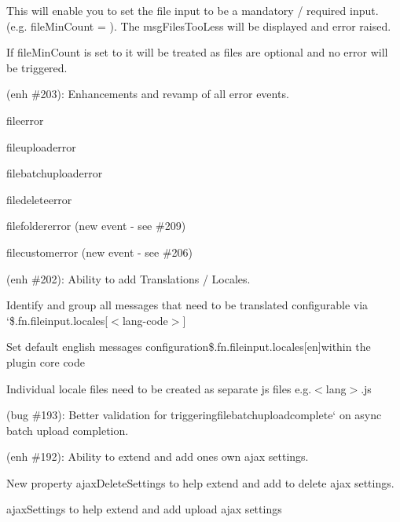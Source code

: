 \begin{DoxyItemize}
\begin{DoxyItemize}
\item This will enable you to set the file input to be a mandatory / required input. (e.\+g. {\ttfamily file\+Min\+Count} = {}). The {\ttfamily msg\+Files\+Too\+Less} will be displayed and error raised.
\item If {\ttfamily file\+Min\+Count} is set to {} it will be treated as files are optional and no error will be triggered.
\end{DoxyItemize}
\item (enh \#203)\+: Enhancements and revamp of all error events.
\begin{DoxyItemize}
\item fileerror
\item fileuploaderror
\item filebatchuploaderror
\item filedeleteerror
\item filefoldererror (new event -\/ see \#209)
\item filecustomerror (new event -\/ see \#206)
\end{DoxyItemize}
\item (enh \#202)\+: Ability to add Translations / Locales.
\begin{DoxyItemize}
\item Identify and group all messages that need to be translated configurable via `\$.fn.\+fileinput.\+locales\mbox{[}\textquotesingle{}$<$lang-\/code$>$\textquotesingle{}\mbox{]}{\ttfamily }
\item {\ttfamily Set default english messages configuration}\$.fn.\+fileinput.\+locales\mbox{[}\textquotesingle{}en\textquotesingle{}\mbox{]}{\ttfamily within the plugin core code}
\item {\ttfamily Individual locale files need to be created as separate js files e.\+g.}$<$lang$>$.js{\ttfamily }
\end{DoxyItemize}
\item {\ttfamily (bug \#193)\+: Better validation for triggering}filebatchuploadcomplete` on async batch upload completion.
\item (enh \#192)\+: Ability to extend and add one\textquotesingle{}s own ajax settings.
\begin{DoxyItemize}
\item New property {\ttfamily ajax\+Delete\+Settings} to help extend and add to delete ajax settings.
\item {\ttfamily ajax\+Settings} to help extend and add upload ajax settings
\end{DoxyItemize}

\end{DoxyItemize}
